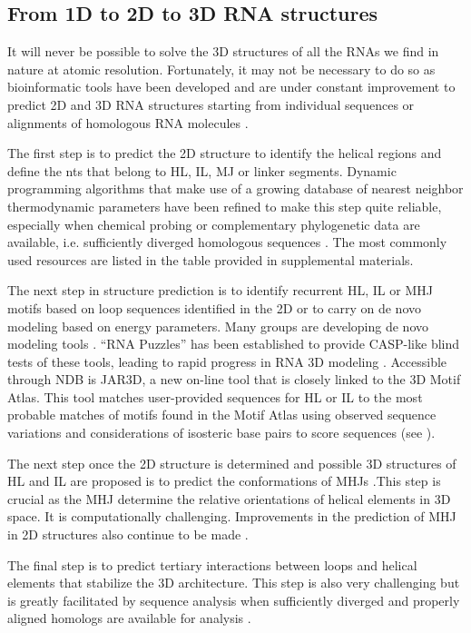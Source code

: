 \subsection{From 1D to 2D to 3D RNA structures}

It will never be possible to solve the 3D structures of all the RNAs we find in
nature at atomic resolution. Fortunately, it may not be necessary to do so as
bioinformatic tools have been developed and are under constant improvement to
predict 2D and 3D RNA structures starting from individual sequences or
alignments of homologous RNA molecules \cite{Leontis2012e}. 

The first step is to predict the 2D structure to identify the helical regions
and define the nts that belong to HL, IL, MJ or linker segments. Dynamic
programming algorithms that make use of a growing database of nearest neighbor
thermodynamic parameters have been refined to make this step quite reliable,
especially when chemical probing or complementary phylogenetic data are
available, i.e. sufficiently diverged homologous sequences \cite{Aigner2012}.
The most commonly used resources are listed in the table provided in
supplemental materials. 

The next step in structure prediction is to identify recurrent HL, IL or MHJ
motifs based on loop sequences identified in the 2D or to carry on de novo
modeling based on energy parameters. Many groups are developing de novo modeling
tools \cite{Rother2012a, Sijenyi2012, Flores2012, Ding2012a, Cao2012}. ``RNA
Puzzles'' has been established to provide CASP-like blind tests of these tools,
leading to rapid progress in RNA 3D modeling \cite{Cruz2012}. Accessible through
NDB is JAR3D, a new on-line tool that is closely linked to the 3D Motif Atlas.
This tool matches user-provided sequences for HL or IL to the most probable
matches of motifs found in the Motif Atlas using observed sequence variations
and considerations of isosteric base pairs to score sequences (see
).

The next step once the 2D structure is determined and possible 3D structures of
HL and IL are proposed is to predict the conformations of MHJs
\cite{Lamiable2012, Laing2011}.This step is crucial as the MHJ determine the
relative orientations of helical elements in 3D space. It is computationally
challenging. Improvements in the prediction of MHJ in 2D structures also
continue to be made \cite{Liu2011b}.

The final step is to predict tertiary interactions between loops and helical
elements that stabilize the 3D architecture. This step is also very challenging
but is greatly facilitated by sequence analysis when sufficiently diverged and
properly aligned homologs are available for analysis \cite{Michel2000,
Westhof2011}.

